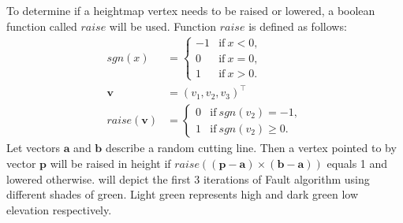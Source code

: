 \documentclass[11pt,a4paper,twoside,openright]{report}
\begin{document}
To determine if a heightmap vertex needs to be raised or lowered, a boolean function called $raise$ will be used. Function $raise$ is defined as follows:
\begin{align*}
sgn(x) &=
\begin{cases}
  -1 & \text{if}\ x < 0, \\
  0 & \text{if}\ x = 0, \\
  1 & \text{if}\ x > 0.
\end{cases} \\
\mathbf{v} &= (v_1, v_2, v_3)^\intercal \\
raise(\mathbf{v}) &=
\begin{cases}
  0 & \text{if}\ sgn(v_2) = -1, \\
  1 & \text{if}\ sgn(v_2) \geq 0.
\end{cases}
\end{align*}
Let vectors $\mathbf{a}$ and $\mathbf{b}$ describe a random cutting line. Then a vertex pointed to by vector $\mathbf{p}$ will be raised in height if $raise((\mathbf{p}-\mathbf{a}) \times (\mathbf{b} - \mathbf{a}))$ equals 1 and lowered otherwise.  will depict the first 3 iterations of Fault algorithm using different shades of green. Light green represents high and dark green low elevation respectively.
\end{document}
